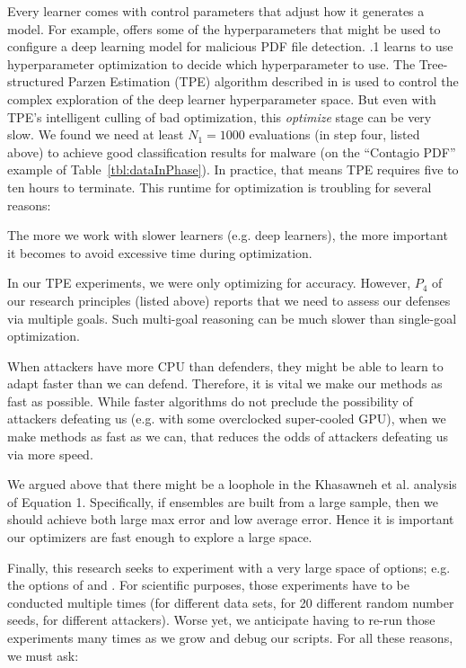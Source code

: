 Every learner comes with control parameters that adjust how it generates a model. For example,  offers some of the hyperparameters that might be used to configure a deep learning model for malicious PDF file detection.
{\IT}.1 learns to use hyperparameter optimization 
to decide which hyperparameter to use. The Tree-structured Parzen Estimation (TPE) algorithm
described in  is used to control the complex exploration of the deep learner hyperparameter space. But even with TPE's intelligent culling of bad optimization, this {\em optimize} stage can be very slow. We found we need at least $N_1=1000$ evaluations
(in step four, listed above) to achieve good 
classification results for malware (on the ``Contagio PDF'' example of Table~\ref{tbl:dataInPhase}).
In practice, that means TPE requires five to ten hours to terminate. This runtime
for optimization is troubling for several reasons:
\bi
\item The more we work
with slower learners (e.g. deep learners), the more
important it becomes to avoid 
excessive time during optimization.
\item
In our TPE experiments, we were only optimizing
for accuracy. However, $P_4$ of our research principles (listed above) reports that we need to assess our defenses via multiple goals. Such multi-goal reasoning can be much slower than single-goal optimization.
\item
When attackers have more CPU than defenders, they might be able to learn to adapt faster than we can defend.
Therefore, it is vital we make
our methods as fast as possible.
While faster algorithms do not preclude the possibility of attackers defeating us (e.g. with some overclocked super-cooled GPU),
when we make methods as fast as we can, that   reduces the odds of attackers defeating us via more speed. 
\item
We argued above
that there might be a loophole in
the 
Khasawneh et al. analysis of Equation 1. Specifically, if
ensembles are built from a  large sample, then  we should achieve both large max error and low average error. Hence it is important
our optimizers are fast
enough to  explore a large space. 
\item Finally,   this research seeks to experiment with a very
large space of options; e.g. the
options of
 and
. For
scientific purposes, those
experiments have  to be conducted multiple times (for different data sets, for 20 different random number seeds, for different attackers). Worse yet, we
anticipate having to re-run those experiments many times as we grow and debug our scripts.
\ei
For all these reasons, we must ask:

